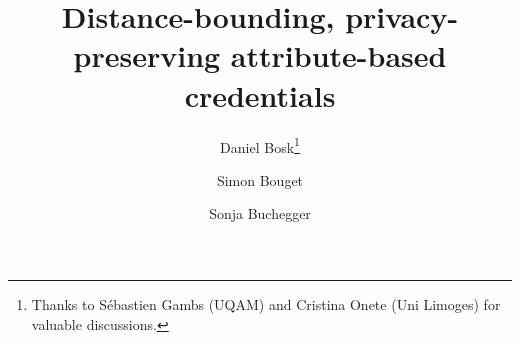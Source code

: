 \documentclass[USenglish]{llncs}
\begin{document}
\author{%
  Daniel Bosk\thanks{%
    Thanks to Sébastien Gambs (UQAM) and Cristina Onete (Uni Limoges) for 
    valuable discussions.
  } \and
  Simon Bouget \and
  Sonja Buchegger%
}

\title{%
  Distance-bounding, privacy-preserving attribute-based credentials
}


\end{document}
